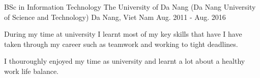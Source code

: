 

\begin{cventries}

  \cventry
    {BSc in Information Technology} %
    {The University of Da Nang (Da Nang University of Science and Technology)} %
    {Da Nang, Viet Nam} %
    {Aug. 2011 - Aug. 2016} %
    {
      \begin{cvitems} %
        \item {During my time at university I learnt most of my key skills that have I have taken through my career such as teamwork and working to tight deadlines.}
        \item {I thouroughly enjoyed my time as university and learnt a lot about a healthy work life balance.}
      \end{cvitems}
    }

\end{cventries}
